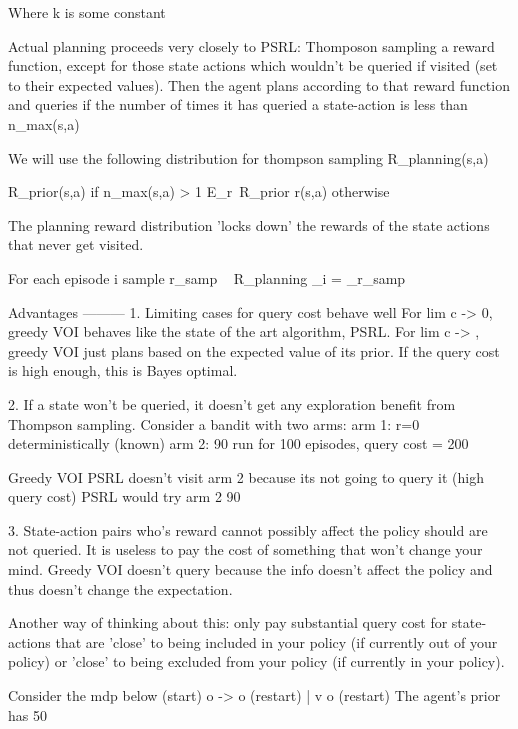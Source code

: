 Where k is some constant 

Actual planning proceeds very closely to PSRL: Thomposon sampling a reward function, except for those state actions which wouldn't be queried if visited (set to their expected values). 
Then the agent plans according to that reward function and queries if the number of times it has queried a state-action is less than n_max(s,a)

We will use the following distribution for thompson sampling
R_planning(s,a) ~ { R_prior(s,a)        if n_max(s,a) > 1
                    E_r~R_prior r(s,a)  otherwise

The planning reward distribution 'locks down' the rewards of the state actions that never get visited.

For each episode i 
  sample r_samp ~ R_planning  
  \pi_i = \pi_{r_samp}


Advantages
---------
1. Limiting cases for query cost behave well 
  For lim c -> 0, greedy VOI behaves like the state of the art algorithm, PSRL.
  For lim c -> \inf, greedy VOI just plans based on the expected value of its prior. If the query cost is high enough, this is Bayes optimal.

2. If a state won't be queried, it doesn't get any exploration benefit from Thompson sampling.
  Consider a bandit with two arms: 
    arm 1: r=0 deterministically (known) 
    arm 2: 90%
  run for 100 episodes, query cost = 200

  Greedy VOI PSRL doesn't visit arm 2 because its not going to query it (high query cost)
  PSRL would try arm 2 90%

3. State-action pairs who's reward cannot possibly affect the policy should are not queried. It is useless to pay the cost of something that won't change your mind.
  Greedy VOI doesn't query because the info doesn't affect the policy and thus doesn't change the expectation.

  Another way of thinking about this:
    only pay substantial query cost for state-actions that are 'close' to being included in your policy (if currently out of your policy) or 'close' to being excluded from your policy (if currently in your policy).

    Consider the mdp below
  (start)
    o -> o (restart)
    |
    v
    o
    (restart)
    The agent's prior has 50%

}
